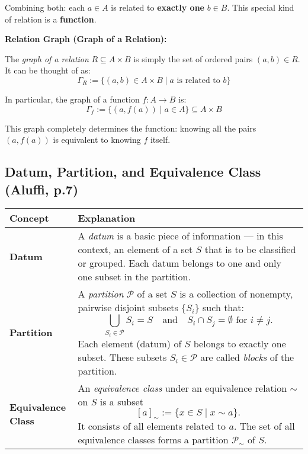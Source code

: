 \documentclass[10pt]{article}
\theoremstyle{plain}
\theoremstyle{definition}
\begin{document}
	Combining both: each \( a \in A \) is related to \textbf{exactly one} \( b \in B \). This special kind of relation is a \textbf{function}.
	
	\medskip
	
	\textbf{Relation Graph (Graph of a Relation):}
	
	The \emph{graph of a relation} \( R \subseteq A \times B \) is simply the set of ordered pairs \( (a,b) \in R \). It can be thought of as:
	\[
	\Gamma_R := \{ (a, b) \in A \times B \mid a \text{ is related to } b \}
	\]
	
	In particular, the graph of a function \( f: A \to B \) is:
	\[
	\Gamma_f := \{ (a, f(a)) \mid a \in A \} \subseteq A \times B
	\]
	
	This graph completely determines the function: knowing all the pairs \( (a, f(a)) \) is equivalent to knowing \( f \) itself.
	
	\subsection*{Datum, Partition, and Equivalence Class (Aluffi, p.7)}
	
	\begin{center}
		\renewcommand{\arraystretch}{1.6}
		\begin{tabular}{|p{3.5cm}|p{11cm}|}
			\hline
			\textbf{Concept} & \textbf{Explanation} \\
			\hline
			
			\textbf{Datum} & A \emph{datum} is a basic piece of information — in this context, an element of a set \( S \) that is to be classified or grouped. Each datum belongs to one and only one subset in the partition. \\
			
			\hline
			
			\textbf{Partition} & A \emph{partition} \( \mathcal{P} \) of a set \( S \) is a collection of nonempty, pairwise disjoint subsets \( \{S_i\} \) such that:
			\[
			\bigcup_{S_i \in \mathcal{P}} S_i = S
			\quad \text{and} \quad S_i \cap S_j = \emptyset \text{ for } i \neq j.
			\]
			Each element (datum) of \( S \) belongs to exactly one subset. These subsets \( S_i \in \mathcal{P} \) are called \emph{blocks} of the partition. \\
			
			\hline
			
			\textbf{Equivalence Class} & An \emph{equivalence class} under an equivalence relation \( \sim \) on \( S \) is a subset
			\[
			[a]_\sim := \{ x \in S \mid x \sim a \}.
			\]
			It consists of all elements related to \( a \). The set of all equivalence classes forms a partition \( \mathcal{P}_\sim \) of \( S \). \\
			
			\hline
		\end{tabular}
	\end{center}
	
\end{document}
